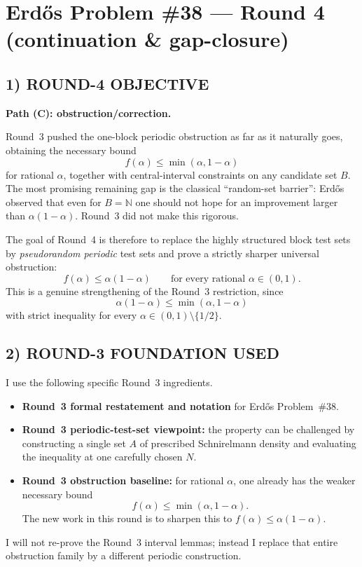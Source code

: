 \section{Erd\H{o}s Problem \#38 --- Round 4 (continuation \& gap-closure)}

\subsection*{1) ROUND-4 OBJECTIVE}
\textbf{Path (C): obstruction/correction.}

Round~3 pushed the one-block periodic obstruction as far as it naturally goes, obtaining the necessary bound
\[
 f(\alpha)\le \min(\alpha,1-\alpha)
\]
for rational $\alpha$, together with central-interval constraints on any candidate set $B$. The most promising remaining gap is the classical ``random-set barrier'': Erd\H{o}s observed that even for $B=\mathbb N$ one should not hope for an improvement larger than $\alpha(1-\alpha)$. Round~3 did not make this rigorous.

The goal of Round~4 is therefore to replace the highly structured block test sets by \emph{pseudorandom periodic} test sets and prove a strictly sharper universal obstruction:
\[
 f(\alpha)\le \alpha(1-\alpha)
\qquad\text{for every rational }\alpha\in(0,1).
\]
This is a genuine strengthening of the Round~3 restriction, since
\[
\alpha(1-\alpha)\le \min(\alpha,1-\alpha)
\]
with strict inequality for every $\alpha\in(0,1)\setminus\{1/2\}$.

\subsection*{2) ROUND-3 FOUNDATION USED}
I use the following specific Round~3 ingredients.
\begin{itemize}
\item \textbf{Round~3 formal restatement and notation} for Erd\H{o}s Problem~\#38.
\item \textbf{Round~3 periodic-test-set viewpoint:} the property can be challenged by constructing a single set $A$ of prescribed Schnirelmann density and evaluating the inequality at one carefully chosen $N$.
\item \textbf{Round~3 obstruction baseline:} for rational $\alpha$, one already has the weaker necessary bound
\[
 f(\alpha)\le \min(\alpha,1-\alpha).
\]
The new work in this round is to sharpen this to $f(\alpha)\le \alpha(1-\alpha)$.
\end{itemize}
I will not re-prove the Round~3 interval lemmas; instead I replace that entire obstruction family by a different periodic construction.

